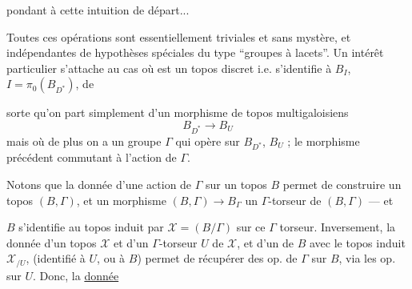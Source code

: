 pondant à cette intuition de départ...


Toutes ces opérations sont essentiellement
triviales et sans mystère, et indépendantes de
 hypothèses spéciales du type ``groupes à
lacets''. Un intérêt particulier s'attache
au cas où  est un topos discret i.e.
s'identifie à $B_I$,  $I=\pi_0(B_{D^*})$, de


sorte qu'on part simplement d'un morphisme
de topos multigaloisiens
\[
 B_{D^*}\longrightarrow B_U
\]
mais où de plus on a un groupe $\Gamma$
qui opère sur $B_{D^*}$, $B_U$ ; le morphisme
précédent commutant à l'action de $\Gamma$.

Notons que la donnée d'une action
de $\Gamma$ sur un topos $B$ permet de
construire un topos $(B,\Gamma)$, et
un morphisme $(B,\Gamma)\longrightarrow B_\Gamma$
 un $\Gamma$-torseur de $(B,\Gamma)$ --- et

$B$ s'identifie au topos induit par
$\mathcal X=(B/\Gamma)$ sur ce $\Gamma$ torseur. Inversement,
la donnée d'un topos $\mathcal X$ et d'un
$\Gamma$-torseur $U$ de $\mathcal X$, et d'un
 de $B$ avec le topos induit
$\mathcal X_{/U}$,  (identifié à $U$, ou à $B$) permet
de récupérer des op. de $\Gamma$ sur $B$,
via les op. sur $U$. Donc, la \uline{donnée}

